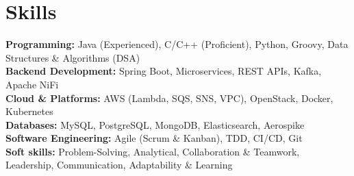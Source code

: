 \section{\Large Skills}
\vspace{4pt}
\textbf{Programming:} Java (Experienced), C/C++ (Proficient), Python, Groovy, Data Structures \& Algorithms (DSA) \\
\vspace{2pt}
\textbf{Backend Development:} Spring Boot, Microservices, REST APIs, Kafka, Apache NiFi \\
\vspace{2pt}
\textbf{Cloud \& Platforms:} AWS (Lambda, SQS, SNS, VPC), OpenStack, Docker, Kubernetes \\
\vspace{2pt}
\textbf{Databases:} MySQL, PostgreSQL, MongoDB, Elasticsearch, Aerospike \\
\vspace{2pt}
\textbf{Software Engineering:} Agile (Scrum \& Kanban), TDD, CI/CD, Git \\
\vspace{2pt}
\textbf{Soft skills:} Problem-Solving, Analytical, Collaboration \& Teamwork, Leadership, Communication, Adaptability \& Learning
